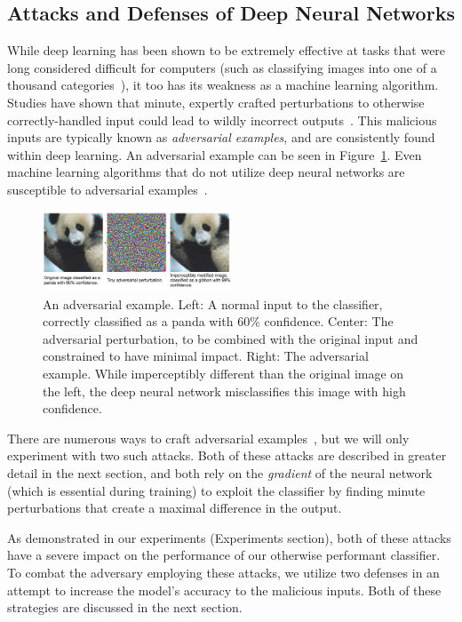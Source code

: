 \documentclass{article}
\begin{document}
\subsection{Attacks and Defenses of Deep Neural Networks}

While deep learning has been shown to be extremely effective at tasks that were
long considered difficult for computers (such as classifying images into one of
a thousand categories~\cite{krizhevsky2012imagenet}), it too has its weakness as
a machine learning algorithm. Studies have shown that minute, expertly crafted
perturbations to otherwise correctly-handled input could lead to wildly
incorrect outputs~\cite{szegedy2013intriguing}. This malicious inputs are
typically known as \textit{adversarial examples}, and are consistently found
within deep learning. An adversarial example can be seen in
Figure~\ref{fig:ax-example}. Even machine learning algorithms that do not utilize deep
neural networks are susceptible to adversarial
examples~\cite{papernot2016transferability}.

\begin{figure}
  \includegraphics[width=0.5\textwidth]{ax-example}
  \caption{An adversarial example. Left: A normal input to the classifier,
  correctly classified as a panda with 60\% confidence. Center: The adversarial
perturbation, to be combined with the original input and constrained to have
minimal impact. Right: The adversarial example. While imperceptibly different
than the original image on the left, the deep neural network misclassifies this
image with high confidence.}
\label{fig:ax-example}
\end{figure}

There are numerous ways to craft adversarial
examples~\cite{szegedy2013intriguing,goodfellow2014explaining,nguyen2015deep,papernot2016limitations,carlini2017towards},
but we will only experiment with two such attacks. Both of these attacks are
described in greater detail in the next section, and both rely on the
\textit{gradient} of the neural network (which is essential during training) to
exploit the classifier by finding minute perturbations that create a maximal
difference in the output.

As demonstrated in our experiments (Experiments section), both of these
attacks have a severe impact on the performance of our otherwise performant
classifier. To combat the adversary employing these attacks, we utilize two
defenses in an attempt to increase the model's accuracy to the malicious inputs.
Both of these strategies are discussed in the next section.
\end{document}
